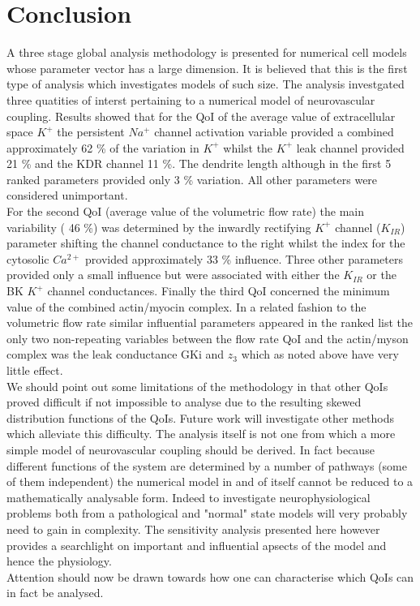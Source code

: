 \section{Conclusion}
 A three stage global analysis methodology is presented for numerical cell models whose parameter vector has a large dimension. It is believed that this is the first type of analysis which investigates models of such size. The analysis investgated three quatities of interst pertaining to a numerical model of neurovascular coupling. Results showed that for the QoI of the average value of extracellular space $K^+$ the persistent $Na^+$  channel activation variable provided a combined approximately 62 \% of the variation in $K^+$ whilst the $K^+$ leak channel provided 21 \% and the KDR channel 11 \%. The dendrite length although in the first 5 ranked parameters provided only 3 \% variation. All other parameters were considered unimportant. \\
 For the second QoI (average value of the volumetric flow rate) the main variability ( 46 \%) was determined by the inwardly rectifying $K^+$ channel ($K_{IR}$)  parameter shifting the channel conductance to the right whilst the index for the cytosolic $Ca^{2+}$   provided approximately 33 \% influence. Three other parameters provided only a small influence but were associated with either the $K_{IR}$  or the BK $K^+$ channel conductances. 
 Finally the third QoI concerned the minimum value of the combined actin/myocin complex. In a related fashion to the volumetric flow rate similar influential parameters appeared in the ranked list the only two non-repeating variables between the flow rate QoI and the actin/myson complex was the leak conductance GKi and $z_3$ which as noted above have very little effect. \\
 We should point out some limitations of the methodology in that other QoIs proved difficult if not impossible to analyse due to the resulting skewed distribution functions of the QoIs. Future work will investigate other methods which alleviate this difficulty. 
 The analysis itself is not one from which a more simple model of neurovascular coupling should be derived. In fact because different functions of the system are determined by a number of pathways (some of them independent) the numerical model in and of itself cannot be reduced to a mathematically analysable form. Indeed to investigate neurophysiological problems both from a pathological and "normal" state models will very probably need to gain in complexity. The sensitivity analysis presented here however provides a searchlight on important and influential apsects of the model and hence the physiology. \\
 Attention should now be drawn towards how one can characterise which QoIs can in fact be analysed. 
%
%
%
